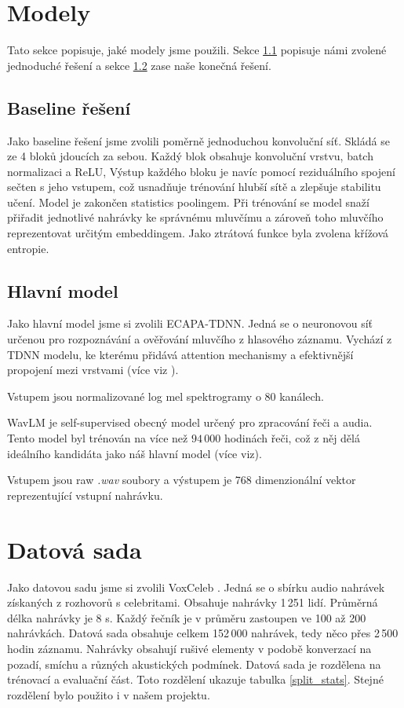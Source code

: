 \documentclass{article}
\begin{document}
\section{Modely} \label{modely}

Tato sekce popisuje, jaké modely jsme použili. Sekce \ref{base} popisuje námi zvolené jednoduché řešení a sekce \ref{main} zase naše konečná řešení.

\subsection{Baseline řešení} \label{base}

Jako baseline řešení jsme zvolili poměrně jednoduchou konvoluční síť. Skládá se ze 4 bloků jdoucích za sebou. Každý blok obsahuje konvoluční vrstvu, batch normalizaci a ReLU, Výstup každého bloku je navíc pomocí reziduálního spojení sečten s jeho vstupem, což usnadňuje trénování hlubší sítě a zlepšuje stabilitu učení. Model je zakončen statistics poolingem. Při trénování se model snaží přiřadit jednotlivé nahrávky ke správnému mluvčímu a zároveň toho mluvčího reprezentovat určitým embeddingem. Jako ztrátová funkce byla zvolena křížová entropie.


\subsection{Hlavní model} \label{main}

Jako hlavní model jsme si zvolili ECAPA-TDNN. Jedná se o neuronovou síť určenou pro rozpoznávání a ověřování mluvčího z hlasového záznamu. Vychází z TDNN modelu, ke kterému přidává attention mechanismy a efektivnější propojení mezi vrstvami (více viz \cite{ECAPA}).

Vstupem jsou normalizované log mel spektrogramy o 80 kanálech. 

WavLM je self-supervised obecný model určený pro zpracování řeči a audia. Tento model byl trénován na více než $94\,000$ hodinách řeči, což z něj dělá ideálního kandidáta jako náš hlavní model (více viz\cite{WavLM}). 

Vstupem jsou raw \textit{.wav} soubory a výstupem je 768 dimenzionální vektor reprezentující vstupní nahrávku.

\section{Datová sada} \label{data}

Jako datovou sadu jsme si zvolili VoxCeleb \cite{Nagrani17VoxCeleb}. Jedná se o sbírku audio nahrávek získaných z rozhovorů s celebritami. Obsahuje nahrávky 1\,251 lidí. Průměrná délka nahrávky je 8 s. Každý řečník je v průměru zastoupen ve 100 až 200 nahrávkách. Datová sada obsahuje celkem 152\,000 nahrávek, tedy něco přes 2\,500 hodin záznamu. Nahrávky obsahují rušivé elementy v podobě konverzací na pozadí, smíchu a různých akustických podmínek. Datová sada je rozdělena na trénovací a evaluační část. Toto rozdělení ukazuje tabulka \ref{split_stats}. Stejné rozdělení bylo použito i v našem projektu.
\end{document}
